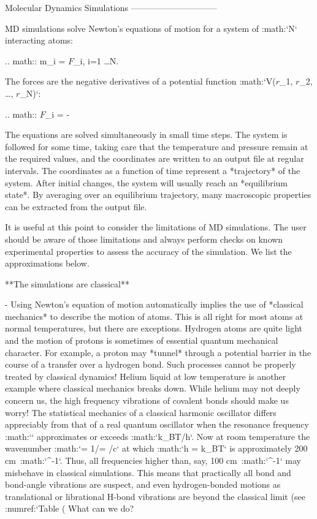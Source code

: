 Molecular Dynamics Simulations
------------------------------

MD simulations solve Newton’s equations of
motion
for a system of :math:`N` interacting atoms:

.. math:: m_i   = {\mbox{\boldmath ${F}$}}_i, \;i=1 \ldots N.

The forces are the negative derivatives of a potential function
:math:`V({\mbox{\boldmath ${r}$}}_1, {\mbox{\boldmath ${r}$}}_2, \ldots, {\mbox{\boldmath ${r}$}}_N)`:

.. math:: {\mbox{\boldmath ${F}$}}_i = - 

The equations are solved simultaneously in small time steps. The system
is followed for some time, taking care that the temperature and pressure
remain at the required values, and the coordinates are written to an
output file at regular intervals. The coordinates as a function of time
represent a *trajectory* of the system. After initial changes, the
system will usually reach an *equilibrium state*. By averaging over an
equilibrium trajectory, many macroscopic properties can be extracted
from the output file.

It is useful at this point to consider the
limitations
of MD simulations. The user
should be aware of those limitations and always perform checks on known
experimental properties to assess the accuracy of the simulation. We
list the approximations below.

**The simulations are classical**

-     Using Newton’s equation of motion automatically implies the use of
      *classical mechanics* to describe the motion of atoms. This is all
      right for most atoms at normal temperatures, but there are
      exceptions. Hydrogen atoms are quite light and the motion of
      protons is sometimes of essential quantum mechanical character.
      For example, a proton may *tunnel* through a potential barrier in
      the course of a transfer over a hydrogen bond. Such processes
      cannot be properly treated by classical dynamics! Helium liquid at
      low temperature is another example where classical mechanics
      breaks down. While helium may not deeply concern us, the high
      frequency vibrations of covalent bonds should make us worry! The
      statistical mechanics of a classical harmonic oscillator differs
      appreciably from that of a real quantum oscillator when the
      resonance frequency :math:`\nu` approximates or exceeds
      :math:`k_BT/h`. Now at room temperature the wavenumber
      :math:`\sigma = 1/\lambda =
      \nu/c` at which :math:`h
      \nu = k_BT` is approximately 200 cm\ :math:`^{-1}`. Thus, all
      frequencies higher than, say, 100 cm\ :math:`^{-1}` may misbehave
      in classical simulations. This means that practically all bond and
      bond-angle vibrations are suspect, and even hydrogen-bonded
      motions as translational or librational H-bond vibrations are
      beyond the classical limit (see
      :numref:`Table (%
      What can we do? 

